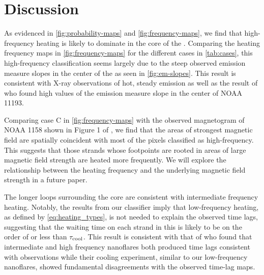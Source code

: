 \section{Discussion}\label{sec:discussion}

As evidenced in \autoref{fig:probability-maps} and \autoref{fig:frequency-maps}, we find that high-frequency heating is likely to dominate in the core of the \AR. Comparing the heating frequency maps in \autoref{fig:frequency-maps} for the different cases in \autoref{tab:cases}, this high-frequency classification seems largely due to the steep observed emission measure slopes in the center of the \AR{} as seen in \autoref{fig:em-slopes}. This result is consistent with X-ray observations of hot, steady emission \citep{warren_evidence_2010,warren_constraints_2011,winebarger_using_2011} as well as the result of \citet{del_zanna_evolution_2015} who found high values of the emission measure slope in the center of NOAA 11193.

Comparing case C in \autoref{fig:frequency-maps} with the observed magnetogram of NOAA 1158 shown in Figure 1 of , we find that the areas of strongest magnetic field are spatially coincident with most of the pixels classified as high-frequency. This suggests that those strands whose footpoints are rooted in areas of large magnetic field strength are heated more frequently. We will explore the relationship between the heating frequency and the underlying magnetic field strength in a future paper.

The longer loops surrounding the core are consistent with intermediate frequency heating. Notably, the results from our classifier imply that low-frequency heating, as defined by \autoref{eq:heating_types}, is not needed to explain the observed time lags, suggesting that the waiting time on each strand in this \AR{} is likely to be on the order of or less than $\tau_\textup{cool}$. This result is consistent with that of \citet{bradshaw_patterns_2016} who found that intermediate and high frequency nanoflares both produced time lags consistent with observations while their cooling experiment, similar to our low-frequency nanoflares, showed fundamental disagreements with the observed time-lag maps.

